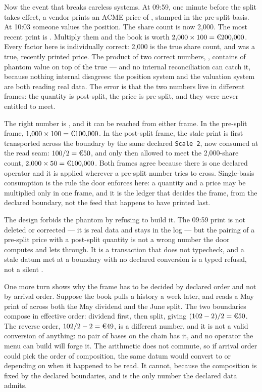 Now the event that breaks careless systems. At 09:59, one minute before the split
takes effect, a vendor prints an ACME price of , stamped in the pre-split
basis. At 10:03 someone values the position. The share count is now 2{,}000. The most
recent print is . Multiply them and the book is worth
$2{,}000 \times 100 = \EUR{200{,}000}$. Every factor here is individually correct:
2{,}000 is the true share count, and  was a true, recently printed price.
The product of two correct numbers, , contains  of
phantom value on top of the true  --- and no internal reconciliation can
catch it, because nothing internal disagrees: the position system and the valuation
system are both reading real data. The error is that the two
numbers live in different frames: the quantity is post-split, the price is pre-split,
and they were never entitled to meet.

The right number is , and it can be reached from either frame. In the
pre-split frame, $1{,}000 \times 100 = \EUR{100{,}000}$. In the post-split frame, the
stale print is first transported across the boundary by the same declared
\texttt{Scale 2}, now consumed at the read seam: $100 / 2 = \EUR{50}$, and only then
allowed to meet the 2{,}000-share count, $2{,}000 \times 50 = \EUR{100{,}000}$. Both
frames agree because there is one declared operator and it is applied wherever a
pre-split number tries to cross. Single-basis consumption is the rule the door
enforces here: a quantity and a price may be multiplied only in one frame, and it is
the ledger that decides the frame, from the declared boundary, not the feed that
happens to have printed last.

The design forbids the phantom by refusing to build it. The 09:59 print is not
deleted or corrected --- it is real data and stays in the log --- but the pairing of a
pre-split price with a post-split quantity is not a wrong number the door computes and
lets through. It is a transaction that does not typecheck, and a stale datum met at a
boundary with no declared conversion is a typed refusal, not a silent .

One more turn shows why the frame has to be decided by declared order and not by
arrival order. Suppose the book pulls a history a week later, and reads a May print of
 across both the May dividend and the June split. The two boundaries compose
in effective order: dividend first, then split, giving $(102 - 2)/2 = \EUR{50}$. The
reverse order, $102/2 - 2 = \EUR{49}$, is a different number, and it is not a valid
conversion of anything: no pair of bases on the chain has it, and no operator the
menu can build will forge it. The arithmetic does not commute, so if arrival order
could pick the order of composition, the same datum would convert to  or
 depending on when it happened to be read. It cannot, because the composition
is fixed by the declared boundaries, and  is the only number the declared
data admits.

